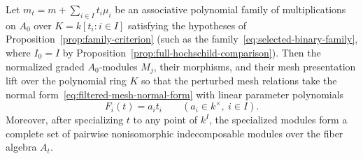 \begin{proposition}
\label{prop:polynomial-mesh-comparison}
Let $m_t=m+\sum_{i\in I}t_i\mu_i$ be an associative polynomial family of multiplications on $A_0$ over $K=k[t_i:i\in I]$ satisfying the hypotheses of Proposition~\ref{prop:family-criterion} (such as the family~\eqref{eq:selected-binary-family}, where $I_0=I$ by Proposition~\ref{prop:full-hochschild-comparison}). Then the normalized graded $A_0$-modules $M_j$, their morphisms, and their mesh presentation lift over the polynomial ring $K$ so that the perturbed mesh relations take the normal form~\eqref{eq:filtered-mesh-normal-form} with linear parameter polynomials
\begin{equation}
  F_i(t)=a_it_i\qquad(a_i\in k^\times,\ i\in I).
  \label{eq:diagonal-marking-map}
\end{equation}
Moreover, after specializing $t$ to any point of $k^I$, the specialized modules form a complete set of pairwise nonisomorphic indecomposable modules over the fiber algebra $A_t$.
\end{proposition}
